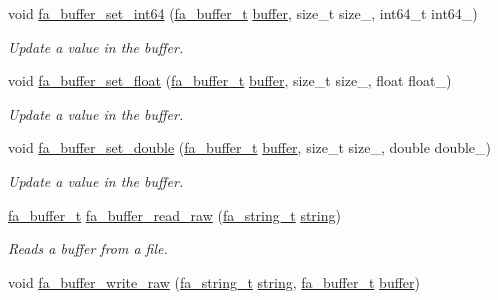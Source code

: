 \begin{DoxyCompactItemize}
void \hyperlink{group___fa_buffer_gaa9703d8e4b82d5640c8fdfeb8ad5068f}{fa\-\_\-buffer\-\_\-set\-\_\-int64} (\hyperlink{group___fa_buffer_ga0ed7a1d783ab322e2e8be02432d0839e}{fa\-\_\-buffer\-\_\-t} \hyperlink{util_8h_ad0c623e8b04565926f5b48888327724a}{buffer}, size\-\_\-t size\-\_\-, int64\-\_\-t int64\-\_\-)
\begin{DoxyCompactList}\small\item\em Update a value in the buffer. \end{DoxyCompactList}\item 
void \hyperlink{group___fa_buffer_gad2df4ce0cc602042aafd794636f5abe3}{fa\-\_\-buffer\-\_\-set\-\_\-float} (\hyperlink{group___fa_buffer_ga0ed7a1d783ab322e2e8be02432d0839e}{fa\-\_\-buffer\-\_\-t} \hyperlink{util_8h_ad0c623e8b04565926f5b48888327724a}{buffer}, size\-\_\-t size\-\_\-, float float\-\_\-)
\begin{DoxyCompactList}\small\item\em Update a value in the buffer. \end{DoxyCompactList}\item 
void \hyperlink{group___fa_buffer_gaa0ebad825c6e97124c1aabeaf17e3631}{fa\-\_\-buffer\-\_\-set\-\_\-double} (\hyperlink{group___fa_buffer_ga0ed7a1d783ab322e2e8be02432d0839e}{fa\-\_\-buffer\-\_\-t} \hyperlink{util_8h_ad0c623e8b04565926f5b48888327724a}{buffer}, size\-\_\-t size\-\_\-, double double\-\_\-)
\begin{DoxyCompactList}\small\item\em Update a value in the buffer. \end{DoxyCompactList}\item 
\hyperlink{group___fa_buffer_ga0ed7a1d783ab322e2e8be02432d0839e}{fa\-\_\-buffer\-\_\-t} \hyperlink{group___fa_buffer_gaf2ee73288b08b98a94fa831731e5b261}{fa\-\_\-buffer\-\_\-read\-\_\-raw} (\hyperlink{group___fa_string_gacada63033b77bc6c39fa632ae199349b}{fa\-\_\-string\-\_\-t} \hyperlink{util_8h_a41106000aac73b61e4fc2ef9dd39a603}{string})
\begin{DoxyCompactList}\small\item\em Reads a buffer from a file. \end{DoxyCompactList}\item 
void \hyperlink{group___fa_buffer_gaf423ff710d861b91fe833e60c860ec7a}{fa\-\_\-buffer\-\_\-write\-\_\-raw} (\hyperlink{group___fa_string_gacada63033b77bc6c39fa632ae199349b}{fa\-\_\-string\-\_\-t} \hyperlink{util_8h_a41106000aac73b61e4fc2ef9dd39a603}{string}, \hyperlink{group___fa_buffer_ga0ed7a1d783ab322e2e8be02432d0839e}{fa\-\_\-buffer\-\_\-t} \hyperlink{util_8h_ad0c623e8b04565926f5b48888327724a}{buffer})

\end{DoxyCompactItemize}
